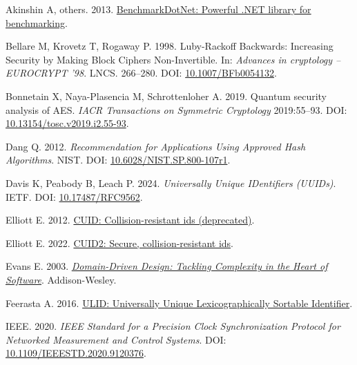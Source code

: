 \documentclass[fleqn,10pt,lineno]{wlpeerj}
\newlength{\cslhangindent}
\newenvironment{CSLReferences}[2]
 {\begin{list}{}{%
  \setlength{\itemindent}{0pt}
  \setlength{\leftmargin}{0pt}
  \setlength{\parsep}{0pt}
  \ifodd #1
   \setlength{\leftmargin}{\cslhangindent}
   \setlength{\itemindent}{-1\cslhangindent}
  \fi
  \setlength{\itemsep}{#2\baselineskip}}}
 {\end{list}}
\begin{document}
\protect{}\label{refs}
\begin{CSLReferences}{1}{0}
{Akinshin A, others}. 2013.
\href{https://github.com/dotnet/BenchmarkDotNet}{{BenchmarkDotNet:
Powerful .NET library for benchmarking}}.

Bellare M, Krovetz T, Rogaway P. 1998. {Luby-Rackoff Backwards:
Increasing Security by Making Block Ciphers Non-Invertible}. In:
\emph{Advances in cryptology -- EUROCRYPT '98}. LNCS. 266--280. DOI:
\href{https://doi.org/10.1007/BFb0054132}{10.1007/BFb0054132}.

Bonnetain X, Naya-Plasencia M, Schrottenloher A. 2019. Quantum security
analysis of {AES}. \emph{IACR Transactions on Symmetric Cryptology}
2019:55--93. DOI:
\href{https://doi.org/10.13154/tosc.v2019.i2.55-93}{10.13154/tosc.v2019.i2.55-93}.

Dang Q. 2012. \emph{{Recommendation for Applications Using Approved Hash
Algorithms}}. NIST. DOI:
\href{https://doi.org/10.6028/NIST.SP.800-107r1}{10.6028/NIST.SP.800-107r1}.

Davis K, Peabody B, Leach P. 2024. \emph{{Universally Unique IDentifiers
(UUIDs)}}. IETF. DOI:
\href{https://doi.org/10.17487/RFC9562}{10.17487/RFC9562}.

Elliott E. 2012. \href{https://github.com/paralleldrive/cuid}{{CUID:
Collision-resistant ids (deprecated)}}.

Elliott E. 2022. \href{https://github.com/paralleldrive/cuid2}{{CUID2:
Secure, collision-resistant ids}}.

Evans E. 2003.
\emph{\href{https://www.oreilly.com/library/view/domain-driven-design-tackling/0321125215/}{{Domain-Driven
Design: Tackling Complexity in the Heart of Software}}}. Addison-Wesley.

Feerasta A. 2016. \href{https://github.com/ulid/spec}{{ULID: Universally
Unique Lexicographically Sortable Identifier}}.

IEEE. 2020. \emph{{IEEE Standard for a Precision Clock Synchronization
Protocol for Networked Measurement and Control Systems}}. DOI:
\href{https://doi.org/10.1109/IEEESTD.2020.9120376}{10.1109/IEEESTD.2020.9120376}.


\end{CSLReferences}
\end{document}
